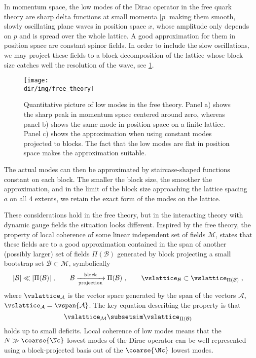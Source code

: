 In momentum space, the low modes of the Dirac operator in the free quark theory are sharp delta functions at small momenta $\lvert p \rvert$ making them smooth, slowly oscillating plane waves in position space $x$, whose amplitude only depends on $p$ and is spread over the whole lattice.
A good approximation for them in position space are constant spinor fields.
In order to include the slow oscillations, we may project these fields to a block decomposition of the lattice whose block size catches well the resolution of the wave, see \cref{fig:free:theory}.
\begin{figure}
    \centering
    \texttt{[image: \\dir/img/free\_theory]}
    \caption{Quantitative picture of low modes in the free theory. Panel a) shows the sharp peak in momentum space centered around zero, whereas panel b) shows the same mode in position space on a finite lattice. Panel c) shows the approximation when using constant modes projected to blocks. The fact that the low modes are flat in position space makes the approximation suitable.}
    \label{fig:free:theory}
\end{figure}
The actual modes can then be approximated by staircase-shaped functions constant on each block.
The smaller the block size, the smoother the approximation, and in the limit of the block size approaching the lattice spacing $a$ on all \num{4} extents, we retain the exact form of the modes on the lattice.

These considerations hold in the free theory, but in the interacting theory with dynamic gauge fields the situation looks different.
Inspired by the free theory, the property of local coherence of some linear independent set of fields $\mathcal{M}$, states that these fields are to a good approximation contained in the span of another (possibly larger) set of fields $\Pi(\mathcal{B})$ generated by block projecting a small bootstrap set $\mathcal{B} \subset \mathcal{M}$, symbolically
\begin{equation} \label{eq:local:coherence:sets}
\lvert \mathcal{B} \rvert \ll \lvert \Pi(\mathcal{B}) \rvert \;,
\qquad
\mathcal{B} \xrightarrow[\text{projection}]{\text{block}} \Pi(\mathcal{B}) \;,
\qquad
\vslattice_{\mathcal{B}} \subset \vslattice_{\Pi(\mathcal{B})} \;,
\end{equation}
where $\vslattice_{\mathcal{A}}$ is the vector space generated by the span of the vectors $\mathcal{A}$, $\vslattice_{\mathcal{A}} = \vspan{\mathcal{A}}$.
The key equation describing the property is that
\begin{equation} \label{eq:local:coherence:set:approx}
\vslattice_{\mathcal{M}} \subsetsim \vslattice_{\Pi(\mathcal{B})}
\end{equation}
holds up to small deficits.
Local coherence of low modes means that the $N \gg \coarse{\Nc}$ lowest modes of the Dirac operator can be well represented using a block-projected basis out of the $\coarse{\Nc}$ lowest modes.

